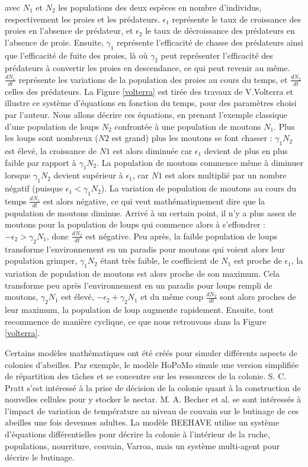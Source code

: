 		avec $N_1$ et $N_2$ les populations des deux espèces en nombre d'individus, respectivement les proies et les prédateurs. $\epsilon_1$ représente le taux de croissance des proies en l'absence de prédateur, et $\epsilon_2$ le taux de décroissance des prédateurs en l'absence de proie. Ensuite, $\gamma_1$ représente l'efficacité de chasse des prédateurs ainsi que l'efficacité de fuite des proies, là où $\gamma_2$ peut représenter l'efficacité des prédateurs à convertir les proies en descendance, ce qui peut revenir au même. $\frac{dN_1}{dt}$ représente les variations de la population des proies au cours du temps, et $\frac{dN_2}{dt}$ celles des prédateurs. La Figure \ref{volterra} est tirée des travaux de V.Volterra et illustre ce système d'équations en fonction du temps, pour des paramètres choisi par l'auteur. Nous allons décrire ces équations, en prenant l'exemple classique d'une population de loups $N_2$ confrontée à une population de moutons $N_1$. Plus les loups sont nombreux ($N2$ est grand) plus les moutons se font chasser : $\gamma_1 N_2$ est élevé, la croissance de $N1$ est alors diminuée car $\epsilon_1$ devient de plus en plus faible par rapport à $\gamma_1 N_2$. La population de moutons commence même à diminuer lorsque $\gamma_1 N_2$ devient supérieur à $\epsilon_1$, car $N1$ est alors multiplié par un nombre négatif (puisque $\epsilon_1 < \gamma_1 N_2$). La variation de population de moutons au cours du temps $\frac{dN_1}{dt}$ est alors négative, ce qui veut mathématiquement dire que la population de moutons diminue. Arrivé à un certain point, il n'y a plus assez de moutons pour la population de loups qui commence alors à s'effondrer : $-\epsilon_2 > \gamma_2 N_1$, donc $\frac{dN_2}{dt}$ est négative. Peu après, la faible population de loups transforme l'environnement en un paradis pour moutons qui voient alors leur population grimper, $\gamma_1 N_2$ étant très faible, le coefficient de $N_1$ est proche de $\epsilon_1$, la variation de population de moutons est alors proche de son maximum. Cela transforme peu après l'environnement en un paradis pour loups rempli de moutons, $\gamma_2 N_1$ est élevé, $- \epsilon_2 + \gamma_2 N_1$ et du même coup $\frac{dN_2}{dt}$ sont alors proches de leur maximum, la population de loup augmente rapidement. Ensuite, tout recommence de manière cyclique, ce que nous retrouvons dans la Figure \ref{volterra}.
		
		Certains modèles mathématiques ont été créés pour simuler différents aspects de colonies d'abeilles. Par exemple, le modèle HoPoMo \cite{schmickl_hopomo_2007} simule une version simplifiée de répartition des tâches et se concentre sur les ressources de la colonie. S. C. Pratt \cite{pratt_optimal_1999} s'est intéressé à la prise de décision de la colonie quant à la construction de nouvelles cellules pour y stocker le nectar. M. A. Becher et al. \cite{becher_brood_2010} se sont intéressés à l'impact de variation de température au niveau de couvain sur le butinage de ces abeilles une fois devenues adultes. La modèle BEEHAVE \cite{becher_beehave_2014} utilise un système d'équations différentielles pour décrire la colonie à l'intérieur de la ruche, populations, nourriture, couvain, Varroa, mais un système multi-agent pour décrire le butinage.
		
